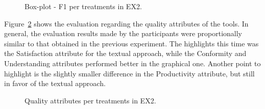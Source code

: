 \begin{figure}[!htb]
        \centering
        \caption{Box-plot - F1 per treatments in EX2.}
        \label{fig:boxplotMeasureF2}
        
\end{figure}

Figure~\ref{fig:inst3GERALExp2} shows the evaluation regarding the quality attributes of the tools.
In general, the evaluation results made by the participants were proportionally similar to that obtained in the previous experiment.
The highlights this time was the Satisfaction attribute for the textual approach, while the Conformity and Understanding attributes performed better in the graphical one.
Another point to highlight is the slightly smaller difference in the Productivity attribute, but still in favor of the textual approach.

\begin{figure}[!htb]
    \centering
    \caption{Quality attributes per treatments in EX2.}
    \label{fig:inst3GERALExp2}
    
\end{figure}

